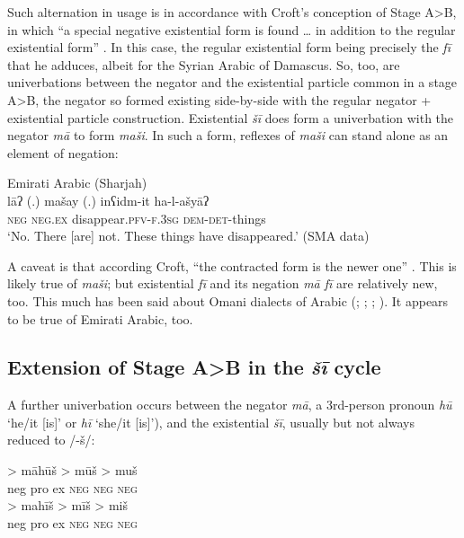 \documentclass[output=paper,colorlinks,citecolor=brown]{langscibook}
\begin{document}
Such alternation in usage is in accordance with Croft’s conception of Stage A>B, in which “a special negative existential form is found … in addition to the regular existential form” \citeyearpar[7]{Croft1991}. In this case, the regular existential form being precisely the \textit{fī} that he adduces, albeit for the Syrian Arabic of Damascus. So, too, are univerbations between the negator and the existential particle common in a stage A>B, the negator so formed existing side-by-side with the regular negator + existential particle construction. Existential \textit{šī} does form a univerbation with the negator \textit{mā} to form \textit{maši}. In such a form, reflexes of \textit{maši} can stand alone as an element of negation:


\ea Emirati Arabic (Sharjah)\label{ex:WiAR-13}\\
	\gll lāʔ (.) mašay (.) inʕidm-it ha-l-ašyāʔ \\
	\textsc{neg} {} \textsc{neg.ex} {} disappear.\textsc{pfv-f.3sg} \textsc{dem-det}-things \\
	\glt ‘No. There [are] not. These things have disappeared.’ (SMA data)
\z

A caveat is that according Croft, “the contracted form is the newer one” \citep[7]{Croft1991}. This is likely true of \textit{maši}; but existential \textit{fī} and its negation \textit{mā fī} are relatively new, too. This much has been said about Omani dialects of Arabic (\citealp[24]{brockett1985a}; \citealp[71]{holes1990a}; \citealp[61]{bernabela2011a}; \citealp[171]{davey2016a}). It appears to be true of Emirati Arabic, too. 

\subsection{Extension of Stage A>B in the \textit{šī} cycle} \label{s:WiAR-3.2}

A further univerbation occurs between the negator \textit{mā}, a 3rd-person pronoun \textit{hū} ‘he/it [is]’ or \textit{hī} ‘she/it [is]’), and the existential \textit{šī}, usually but not always reduced to /-š/:

\ea \label{ex:WiAR-14}
  \ea
  	 > māhūš > mūš > muš\\
  	{\sc neg pro ex} {} \textsc{neg} {} \textsc{neg} {} \textsc{neg}\\
  \ex
  	 > mahīš > mīš > miš\\
  	{\sc neg pro ex} {} \textsc{neg}  {} \textsc{neg} {} \textsc{neg}\\
\z \z
\end{document}
